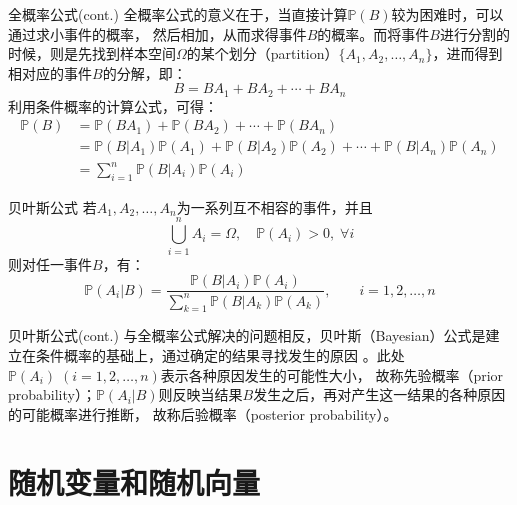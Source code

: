 \documentclass[t]{beamer}
\renewcommand{\Pr}{\mathbb{P}}
\begin{document}
    \begin{frame}{全概率公式(cont.)} 
      全概率公式的意义在于，当直接计算$\Pr(B)$较为困难时，可以通过求小事件的概率，
然后相加，从而求得事件$B$的概率。而将事件$B$进行分割的时候，则是先找到样本空间$\Omega$的某个划分（partition）$\{A_1,A_2,\ldots,A_n\}$，进而得到相对应的事件$B$的分解，即：
\begin{equation*}B=BA_1+BA_2+\cdots +BA_n \end{equation*}
利用条件概率的计算公式，可得：
\begin{equation*}\begin{split}
\Pr(B)&=\Pr(BA_1)+\Pr(BA_2)+\cdots +\Pr(BA_n)\\
&=
\Pr(B|A_1)\Pr(A_1)+\Pr(B|A_2)\Pr(A_2)+\cdots+\Pr(B|A_n)\Pr(A_n)\\&=\sum^{n}_{i=1}\Pr(B|A_i)\Pr(A_i)
\end{split}\end{equation*}
  \end{frame}


  \begin{frame}{贝叶斯公式}
    若$A_1,A_2,\ldots,A_n$为一系列互不相容的事件，并且
    \begin{equation*}\bigcup^{n}_{i=1}A_i=\Omega,\quad \Pr(A_i)>0,\;
    \forall i \end{equation*}
    则对任一事件$B$，有：
    \begin{equation*}\Pr(A_i|B)=\frac{\Pr(B|A_i)
    \Pr(A_i)}{\displaystyle\sum_{k=1}^{n}\Pr(B|A_k)\Pr(A_k)}, \qquad
    i=1,2,\ldots,n \end{equation*}
  
  \end{frame}
  
  \begin{frame}{贝叶斯公式(cont.)}
    与全概率公式解决的问题相反，贝叶斯（Bayesian）公式是建立在条件概率的基础上，通过确定的结果寻找发生的原因
    。此处$\Pr(A_i)\; (i=1,2,\ldots,n)$表示各种原因发生的可能性大小，
    故称先验概率（prior
    probability）；$\Pr(A_i|B)$则反映当结果$B$发生之后，再对产生这一结果的各种原因的可能概率进行推断，
    故称后验概率（posterior probability）。
  
  \end{frame}


  \section{随机变量和随机向量}
\end{document}

